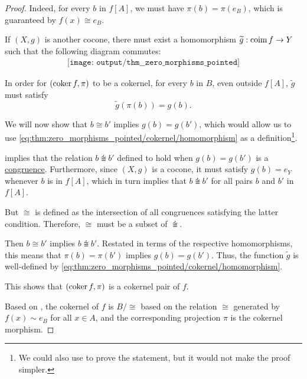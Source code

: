 \begin{proof}
  Indeed, for every \( b \) in \( f[A] \), we must have \( \pi(b) = \pi(e_B) \), which is guaranteed by \( f(x) \cong e_B \).

   If \( (X, g) \) is another cocone, there must exist a homomorphism \( \widetilde g: \operatorname*{co\negthinspace\operatorname{im}} f \to Y \) such that the following diagram commutes:
  \begin{equation*}
    \begin{aligned}
      \texttt{[image: output/thm\_\_zero\_morphisms\_pointed]}
    \end{aligned}
  \end{equation*}

  In order for \( (\operatorname*{co\negthinspace\ker} f, \pi) \) to be a cokernel, for every \( b \) in \( B \), even outside \( f[A] \), \( \widetilde g \) must satisfy
  \begin{equation}\label{eq:thm:zero_morphisms_pointed/cokernel/homomorphism}
    \widetilde{g}(\pi(b)) = g(b).
  \end{equation}

  We will now show that \( b \cong b' \) implies \( g(b) = g(b') \), which would allow us to use \eqref{eq:thm:zero_morphisms_pointed/cokernel/homomorphism} as a definition\footnote{We could also use  to prove the statement, but it would not make the proof simpler.}.

   implies that the relation \( b \congdot b' \) defined to hold when \( g(b) = g(b') \) is a \hyperref[def:first_order_congruence]{congruence}. Furthermore, since \( (X, g) \) is a cocone, it must satisfy \( g(b) = e_Y \) whenever \( b \) is in \( f[A] \), which in turn implies that \( b \congdot b' \) for all pairs \( b \) and \( b' \) in \( f[A] \).

  But \( {\cong} \) is defined as the intersection of all congruences satisfying the latter condition. Therefore, \( {\cong} \) must be a subset of \( {\congdot} \).

  Then \( b \cong b' \) implies \( b \congdot b' \). Restated in terms of the respective homomorphisms, this means that \( \pi(b) = \pi(b') \) implies \( g(b) = g(b') \). Thus, the function \( \widetilde{g} \) is well-defined by \eqref{eq:thm:zero_morphisms_pointed/cokernel/homomorphism}.

  This shows that \( (\operatorname*{co\negthinspace\ker} f, \pi) \) is a cokernel pair of \( f \).

   Based on , the cokernel of \( f \) is \( B / {\cong} \) based on the relation \( {\cong} \) generated by \( f(x) \sim e_B \) for all \( x \in A \), and the corresponding projection \( \pi \) is the cokernel morphism.


\end{proof}
